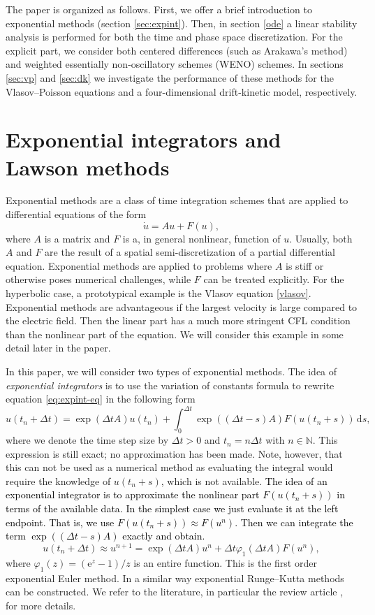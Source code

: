 The paper is organized as follows. First, we offer a brief introduction to exponential methods (section \ref{sec:expint}). Then, in section \ref{ode} a linear stability analysis is performed for both the time and phase space discretization. For the explicit part, we consider both centered differences (such as Arakawa's method) and weighted essentially non-oscillatory schemes (WENO) schemes. In sections \ref{sec:vp} and \ref{sec:dk} we investigate the performance of these methods for the Vlasov--Poisson equations and a four-dimensional drift-kinetic model, respectively. 

\section{Exponential integrators and Lawson methods \label{sec:expint}}

Exponential methods are a class of time integration schemes that are applied to differential equations of the form
\begin{equation} \label{eq:expint-eq} \dot{u} = Au + F(u), \end{equation}
where $A$ is a matrix and $F$ is a, in general nonlinear, function of $u$. Usually, both $A$ and $F$ are the result of a spatial semi-discretization of a partial differential equation. Exponential methods are applied to problems where $A$ is stiff or otherwise poses numerical challenges, while $F$ can be treated explicitly.
For the hyperbolic case, a prototypical example is the Vlasov equation \eqref{vlasov}. 
Exponential methods are advantageous if the largest velocity is large compared to the electric field. 
Then the linear part has a much more stringent CFL condition than the nonlinear part of the equation. 
We will consider this example in some detail later in the paper.

In this paper, we will consider two types of exponential methods. The idea of \textit{exponential integrators} is to use the variation of constants formula to rewrite equation \eqref{eq:expint-eq} in the following form
\[ u(t_n+\Delta t) = \exp(\Delta t A) u(t_n) + \int_0^{\Delta t} \exp((\Delta t -s)A) F(u(t_n+s)) \,\mathrm{d}s, \]
where we denote the time step size by $\Delta t >0$ and $t_n = n\Delta t$ with $n\in\mathbb{N}$. This expression is still exact; \ie no approximation has been made. Note, however, that this can not be used as a numerical method as evaluating the integral would require the knowledge of $u(t_n+s)$, which is not available. \textcolor{black}{The idea of an exponential integrator is to approximate the nonlinear part $F(u(t_n+s))$ in terms of the available data. In the simplest case we just evaluate it at the left endpoint. That is, we use $F(u(t_n+s))\approx F(u^n)$. Then we can integrate the term $\exp((\Delta t -s)A)$ exactly and obtain.}
\[ u(t_n+\Delta t) \approx u^{n+1} = \exp(\Delta t A) u^n + \Delta t \varphi_1(\Delta t A) F(u^n), \]
where $\varphi_1(z)=(\mathrm{e}^z-1)/z$ is an entire function. This is the first order exponential Euler method. In a similar way exponential Runge--Kutta methods can be constructed. We refer to the literature, in particular the review article \cite{ei}, for more details.

